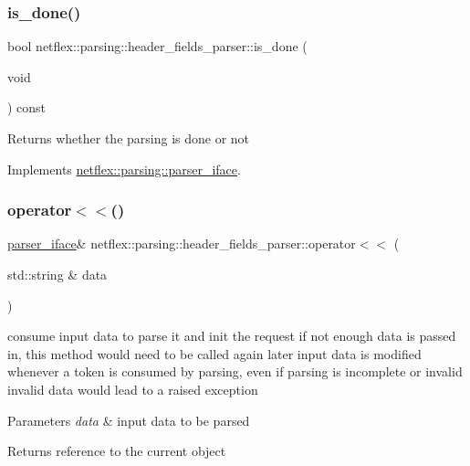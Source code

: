 \subsubsection{\texorpdfstring{is\+\_\+done()}{is\_done()}}
{\footnotesize\ttfamily bool netflex\+::parsing\+::header\+\_\+fields\+\_\+parser\+::is\+\_\+done (\begin{DoxyParamCaption}\item[{void}]{ }\end{DoxyParamCaption}) const\hspace{0.3cm}{\ttfamily [virtual]}}

\begin{DoxyReturn}{Returns}
whether the parsing is done or not 
\end{DoxyReturn}


Implements \hyperlink{classnetflex_1_1parsing_1_1parser__iface_afebd1cc50d5958f712dfac0c023fd162}{netflex\+::parsing\+::parser\+\_\+iface}.

\mbox{\label{classnetflex_1_1parsing_1_1header__fields__parser_a4ba3f5dad38f3f9ef9bf3632f02d4111}} 
\subsubsection{\texorpdfstring{operator$<$$<$()}{operator<<()}}
{\footnotesize\ttfamily \hyperlink{classnetflex_1_1parsing_1_1parser__iface}{parser\+\_\+iface}\& netflex\+::parsing\+::header\+\_\+fields\+\_\+parser\+::operator$<$$<$ (\begin{DoxyParamCaption}\item[{std\+::string \&}]{data }\end{DoxyParamCaption})\hspace{0.3cm}{\ttfamily [virtual]}}

consume input data to parse it and init the request if not enough data is passed in, this method would need to be called again later input data is modified whenever a token is consumed by parsing, even if parsing is incomplete or invalid invalid data would lead to a raised exception


\begin{DoxyParams}{Parameters}
{\em data} & input data to be parsed \\
\hline
\end{DoxyParams}
\begin{DoxyReturn}{Returns}
reference to the current object 
\end{DoxyReturn}


